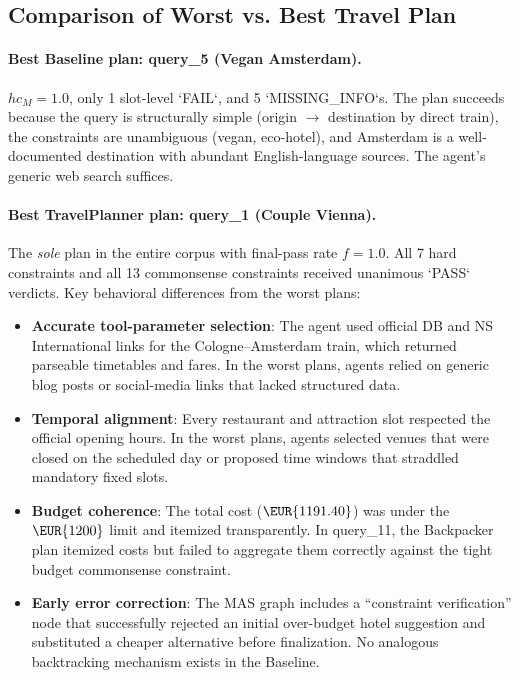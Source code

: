 \documentclass[a4paper,oneside,bibliography=totoc]{scrbook}
\begin{document}
\subsection{Comparison of Worst vs. Best Travel Plan}
\label{subsec:best-worst}

\paragraph{Best Baseline plan: query\_5 (Vegan Amsterdam).} $hc_M=1.0$, only 1 slot-level `FAIL`, and 5 `MISSING\_INFO`s. The plan succeeds because the query is structurally simple (origin $\to$ destination by direct train), the constraints are unambiguous (vegan, eco-hotel), and Amsterdam is a well-documented destination with abundant English-language sources. The agent's generic web search suffices.

\paragraph{Best TravelPlanner plan: query\_1 (Couple Vienna).} The \emph{sole} plan in the entire corpus with final-pass rate $f = 1.0$. All 7 hard constraints and all 13 commonsense constraints received unanimous `PASS` verdicts. Key behavioral differences from the worst plans:

\begin{itemize}
    \item \textbf{Accurate tool-parameter selection}: The agent used official DB and NS International links for the Cologne--Amsterdam train, which returned parseable timetables and fares. In the worst plans, agents relied on generic blog posts or social-media links that lacked structured data.
    \item \textbf{Temporal alignment}: Every restaurant and attraction slot respected the official opening hours. In the worst plans, agents selected venues that were closed on the scheduled day or proposed time windows that straddled mandatory fixed slots.
    \item \textbf{Budget coherence}: The total cost ($\EUR{1191.40}$) was under the $\EUR{1200}$ limit and itemized transparently. In query\_11, the Backpacker plan itemized costs but failed to aggregate them correctly against the tight budget commonsense constraint.
    \item \textbf{Early error correction}: The MAS graph includes a ``constraint verification'' node that successfully rejected an initial over-budget hotel suggestion and substituted a cheaper alternative before finalization. No analogous backtracking mechanism exists in the Baseline.
\end{itemize}
\end{document}
